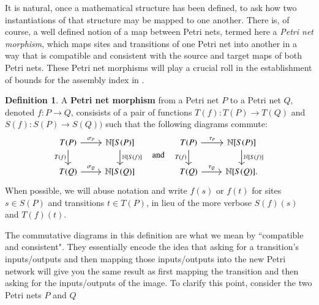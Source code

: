\documentclass[aps,prd,onecolumn,nofootinbib,letterpaper,preprintnumbers,superscriptaddress,eqsecnum]{revtex4}
\theoremstyle{definition}
\newtheorem{definition}{Definition}
\newcommand{\N}{\mathbb{N}}
\begin{document}
It is natural, once a mathematical structure has been defined, to ask how two instantiations of that structure may be mapped to one another.
There is, of course, a well defined notion of a map between Petri nets, termed here a \textit{Petri net morphism}, which maps sites and transitions of one Petri net into another in a way that is compatible and consistent with the source and target maps of both Petri nets.
These Petri net morphisms will play a crucial roll in the establishment of bounds for the assembly index in .

\begin{definition}\label{def:petri-map}
    A \textbf{Petri net morphism} from a Petri net $P$ to a Petri net $Q$, denoted $f : P \rightarrow Q$, consisists of a pair of functions $T(f) : T(P) \rightarrow T(Q)$ and $S(f): S(P) \rightarrow S(Q))$ such that the following diagrams commute:
    \begin{equation*}
        \begin{tikzcd}
            T(P)
            \arrow[r, "\sigma_P"]
            \arrow[d, "T(f)", swap]
            &
            \N[S(P)]
            \arrow[d, "\N \lbrack S(f) \rbrack"]
            \\
            T(Q)
            \arrow[r, "\sigma_Q"]
            &
            \N[S(Q)]
        \end{tikzcd}
        \quad
        \textrm{and}
        \quad
        \begin{tikzcd}
            T(P)
            \arrow[r, "\tau_P"]
            \arrow[d, "T(f)", swap]
            &
            \N[S(P)]
            \arrow[d, "\N \lbrack S(f) \rbrack"]
            \\
            T(Q)
            \arrow[r, "\tau_Q"]
            &
            \N[S(Q)].
        \end{tikzcd}
    \end{equation*}
    When possible, we will abuse notation and write $f(s)$ or $f(t)$ for sites $s \in S(P)$ and transitions $t \in T(P)$, in lieu of the more verbose $S(f)(s)$ and $T(f)(t)$.
\end{definition}

The commutative diagrams in this definition are what we mean by ``compatible and consistent".
They essentially encode the idea that asking for a transition's inputs/outputs and then mapping those inputs/outputs into the new Petri network will give you the same result as first mapping the transition and then asking for the inputs/outputs of the image.
To clarify this point, consider the two Petri nets $P$ and $Q$
\end{document}
